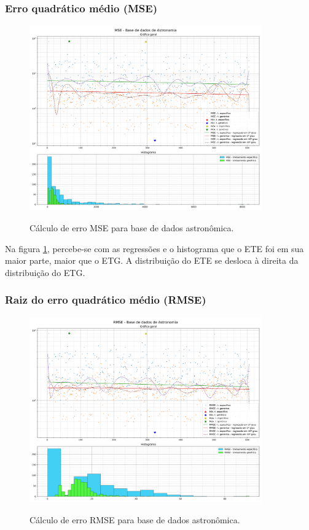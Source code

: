 \subsubsection{Erro quadrático médio (MSE)}
\label{sec:result:astronomy:mse}

\begin{figure}[H]
    \centering
    \caption{Cálculo de erro MSE para base de dados astronômica.}
    \includegraphics[width=10cm]{fig/resultados/astronomy/png/mse_astronomy_compound.png}
    \label{fig:results:fig5}
\end{figure}

Na figura \ref{fig:results:fig5}, percebe-se com as regressões e o histograma que o ETE foi em sua maior parte, maior que o ETG. A distribuição do ETE se desloca à direita da distribuição do ETG.

\subsubsection{Raiz do erro quadrático médio (RMSE)}
\label{sec:result:astronomy:rmse}

\begin{figure}[H]
    \centering
    \caption{Cálculo de erro RMSE para base de dados astronômica.}
    \includegraphics[width=10cm]{fig/resultados/astronomy/png/rmse_astronomy_compound.png}
    \label{fig:results:fig6}
\end{figure}

